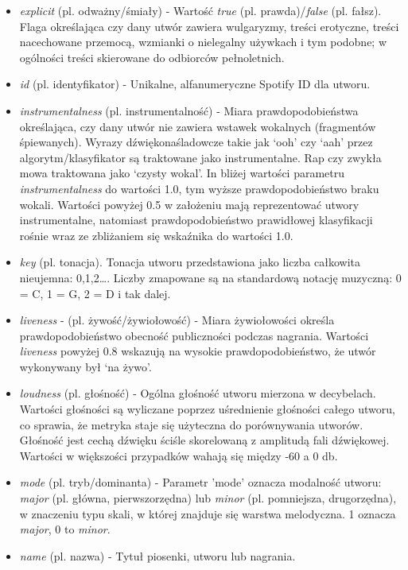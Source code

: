 \documentclass[a4paper,11pt]{article}
\begin{document}
\begin{itemize}
        \item \textit{explicit} (pl. odważny/śmiały) - Wartość \textit{true} (pl. prawda)/\textit{false} (pl. fałsz). Flaga określająca czy dany utwór zawiera wulgaryzmy, treści erotyczne, treści nacechowane przemocą, wzmianki o nielegalny używkach i tym podobne; w ogólności treści skierowane do odbiorców pełnoletnich.
        \item \textit{id} (pl. identyfikator) - Unikalne, alfanumeryczne Spotify ID dla utworu.
        \item \textit{instrumentalness} (pl. instrumentalność) - Miara prawdopodobieństwa określająca, czy dany utwór nie zawiera wstawek wokalnych (fragmentów śpiewanych). Wyrazy dźwiękonaśladowcze takie jak `ooh' czy `aah' przez algorytm/klasyfikator są traktowane jako instrumentalne. Rap czy zwykła mowa traktowana jako `czysty wokal'. In bliżej wartości parametru \textit{instrumentalness} do wartości 1.0, tym wyższe prawdopodobieństwo braku wokali. Wartości powyżej 0.5 w założeniu mają reprezentować utwory instrumentalne, natomiast prawdopodobieństwo prawidłowej klasyfikacji rośnie wraz ze zbliżaniem się wskaźnika do wartości 1.0.
        \item \textit{key} (pl. tonacja). Tonacja utworu przedstawiona jako liczba całkowita nieujemna: 0,1,2\ldots . Liczby zmapowane są na standardową notację muzyczną: 0 = C, 1 = G, 2 = D i tak dalej.
        \item \textit{liveness} - (pl. żywość/żywiołowość) - Miara żywiołowości określa prawdopodobieństwo obecność publiczności podczas nagrania. Wartości \textit{liveness} powyżej 0.8 wskazują na wysokie prawdopodobieństwo, że utwór wykonywany był `na żywo'.
        \item \textit{loudness} (pl. głośność) - Ogólna głośność utworu mierzona w decybelach. Wartości głośności są wyliczane poprzez uśrednienie głośności całego utworu, co sprawia, że metryka staje się użyteczna do porównywania utworów. Głośność jest cechą dźwięku ściśle skorelowaną z amplitudą fali dźwiękowej. Wartości w większości przypadków wahają się między -60 a 0 db.
        \item \textit{mode} (pl. tryb/dominanta) - Parametr 'mode' oznacza modalność utworu: \textit{major} (pl. główna, pierwszorzędna) lub \textit{minor} (pl. pomniejsza, drugorzędna), w znaczeniu typu skali, w której znajduje się warstwa melodyczna. 1 oznacza \textit{major}, 0 to \textit{minor}.
        \item \textit{name} (pl. nazwa) - Tytuł piosenki, utworu lub nagrania.

\end{itemize}
\end{document}
